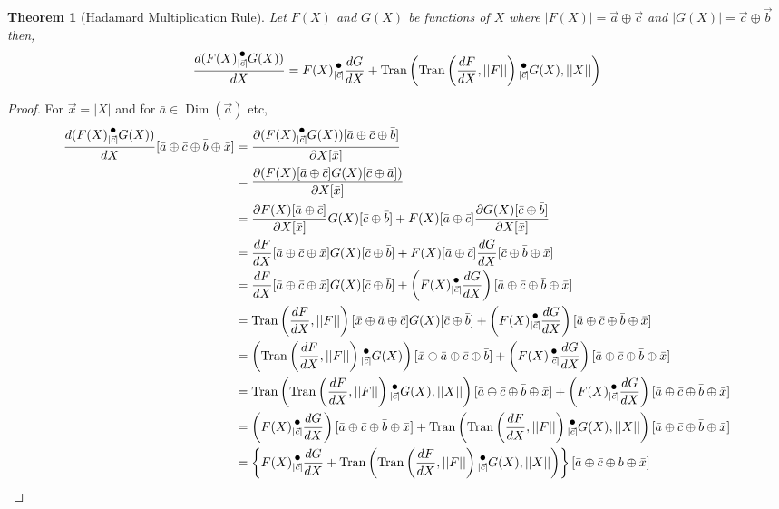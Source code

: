 \documentclass[12pt]{book}
\theoremstyle{plain}
\newtheorem{theorem}{Theorem}[chapter]
\theoremstyle{definition}
\theoremstyle{ppart}
\theoremstyle{case}
\theoremstyle{solution}
\DeclareMathOperator{\Dim}{Dim}
\DeclareMathOperator{\Tran}{Tran}
\newcommand{\dmult}[1]{\text{\raisebox{1ex}{$\underset{#1}{\,\bullet\,}$}}}
\begin{document}
\begin{theorem}[Hadamard Multiplication Rule]
Let $F(X)$ and $G(X)$ be functions of $X$ where
$|F(X)| = \vec{a} \oplus \vec{c}$ and $|G(X)| = \vec{c} \oplus \vec{b}$
then,
\[
  \frac{d(F(X) \dmult{|\vec{c}|} G(X))}{dX} =
    F(X) \dmult{|\vec{c}|} \frac{dG}{dX} +
    \Tran\left(\Tran\left(\frac{dF}{dX}, ||F||\right) \dmult{|\vec{c}|} G(X), ||X||\right)
\]
\end{theorem}
\begin{landscape}
\begin{proof}
For $\vec{x} = |X|$ and for $\bar{a} \in \Dim(\vec{a})$ etc,
\begin{align*}
\frac{d(F(X) \dmult{|\vec{c}|} G(X))}{dX}[\bar{a} \oplus \bar{c} \oplus \bar{b} \oplus \bar{x}]
  &= \frac{\partial (F(X) \dmult{|\vec{c}|} G(X))[\bar{a} \oplus \bar{c} \oplus \bar{b}]}{\partial X[\bar{x}]} \\
  &= \frac{\partial (F(X)[\bar{a} \oplus \bar{c}] G(X)[\bar{c} \oplus \bar{a}])}{\partial X[\bar{x}]} \\
  &= \frac{\partial F(X)[\bar{a} \oplus \bar{c}]}{\partial X[\bar{x}]} G(X)[\bar{c} \oplus \bar{b}]
    + F(X)[\bar{a} \oplus \bar{c}] \frac{\partial G(X)[\bar{c} \oplus \bar{b}]}{\partial X[\bar{x}]} \\
  &= \frac{dF}{dX}[\bar{a} \oplus \bar{c} \oplus \bar{x}] G(X)[\bar{c} \oplus \bar{b}]
    + F(X)[\bar{a} \oplus \bar{c}] \frac{dG}{dX}[\bar{c} \oplus \bar{b} \oplus \bar{x}] \\
  &= \frac{dF}{dX}[\bar{a} \oplus \bar{c} \oplus \bar{x}] G(X)[\bar{c} \oplus \bar{b}]
    + \left(F(X) \dmult{|\vec{c}|} \frac{dG}{dX}\right)[\bar{a} \oplus \bar{c} \oplus \bar{b} \oplus \bar{x}] \\
  &= \Tran\left(\frac{dF}{dX}, ||F||\right)[\bar{x} \oplus \bar{a} \oplus \bar{c}] G(X)[\bar{c} \oplus \bar{b}]
    + \left(F(X) \dmult{|\vec{c}|} \frac{dG}{dX}\right)[\bar{a} \oplus \bar{c} \oplus \bar{b} \oplus \bar{x}] \\
  &= \left(\Tran\left(\frac{dF}{dX}, ||F||\right) \dmult{|\vec{c}|} G(X)\right) [\bar{x} \oplus \bar{a} \oplus \bar{c} \oplus \bar{b}]
    + \left(F(X) \dmult{|\vec{c}|} \frac{dG}{dX}\right)[\bar{a} \oplus \bar{c} \oplus \bar{b} \oplus \bar{x}] \\
  &= \Tran\left(\Tran\left(\frac{dF}{dX}, ||F||\right) \dmult{|\vec{c}|} G(X), ||X||\right) [\bar{a} \oplus \bar{c} \oplus \bar{b} \oplus \bar{x}]
    + \left(F(X) \dmult{|\vec{c}|} \frac{dG}{dX}\right)[\bar{a} \oplus \bar{c} \oplus \bar{b} \oplus \bar{x}] \\
  &= \left(F(X) \dmult{|\vec{c}|} \frac{dG}{dX}\right)[\bar{a} \oplus \bar{c} \oplus \bar{b} \oplus \bar{x}]
    + \Tran\left(\Tran\left(\frac{dF}{dX}, ||F||\right) \dmult{|\vec{c}|} G(X), ||X||\right) [\bar{a} \oplus \bar{c} \oplus \bar{b} \oplus \bar{x}] \\
  &= \left\{ F(X) \dmult{|\vec{c}|} \frac{dG}{dX}
    + \Tran\left(\Tran\left(\frac{dF}{dX}, ||F||\right) \dmult{|\vec{c}|} G(X), ||X||\right) \right\}[\bar{a} \oplus \bar{c} \oplus \bar{b} \oplus \bar{x}]
\end{align*}
\end{proof}
\end{landscape}
\end{document}
